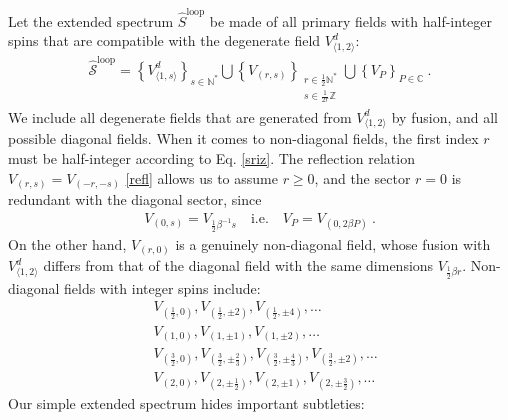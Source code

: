 \documentclass[12pt, a4paper]{article}
\theoremstyle{break}
\begin{document}
Let the extended spectrum $\widehat{S}^\text{loop}$ be made of all primary fields with half-integer spins that are compatible with the degenerate field $V^d_{\langle 1,2\rangle}$:
\begin{align}
 \boxed{\widehat{\mathcal{S}}^\text{loop} = \left\{V^d_{\langle 1,s\rangle}\right\}_{s\in\mathbb{N}^*}  \bigcup \left\{V_{(r,s)}\right\}_{\substack{r\in \frac12\mathbb{N}^*\\ s\in\frac{1}{2r}\mathbb{Z}}}\bigcup \left\{ V_P\right\}_{P\in\mathbb{C}} } \ .
 \label{sloop}
\end{align}
We include all degenerate fields that are generated from $V^d_{\langle 1,2\rangle}$ by fusion, and all possible diagonal fields. When it comes to non-diagonal fields, the first index $r$ must be half-integer according to Eq. \eqref{sriz}. The reflection relation $V_{(r,s)}=V_{(-r,-s)}$ \eqref{refl} allows us to assume $r\geq 0$, and the sector $r=0$ is redundant with the diagonal sector, since 
\begin{align}
 \boxed{V_{(0,s)} = V_{\frac12\beta^{-1}s}  \quad \text{i.e.} \quad V_P = V_{(0,2\beta P)}} \ .
 \label{sP}
\end{align}
On the other hand, $V_{(r,0)}$ is a genuinely non-diagonal field, whose fusion with $V^d_{\langle 1,2\rangle}$ differs from that of the diagonal field with the same dimensions $V_{\frac12\beta r}$. 
Non-diagonal fields with integer spins include:
\begin{subequations}
\label{vex}
\begin{align}
 & V_{(\frac12, 0)}, V_{(\frac12,\pm 2)}, V_{(\frac12, \pm 4)}, \dots
 \\
 & V_{(1,0)}, V_{(1,\pm 1)}, V_{(1,\pm 2)}, \dots 
 \\
 & V_{(\frac32, 0)}, V_{(\frac32, \pm\frac23)}, V_{(\frac32,\pm \frac43)} , V_{(\frac32,\pm 2)}, \dots 
 \\
 & V_{(2, 0)}, V_{(2,\pm\frac12)}, V_{(2,\pm 1)}, V_{(2,\pm\frac32)}, \dots 
\end{align}
\end{subequations}
Our simple extended spectrum hides important subtleties: 
\end{document}
